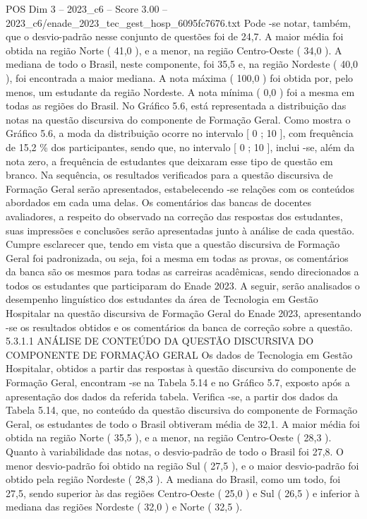 \begin{textsample}{POS Dim 3 – 2023\_c6 – Score 3.00 – 2023\_c6/enade\_2023\_tec\_gest\_hosp\_6095fc7676.txt}
Pode -se notar, também, que o desvio-padrão nesse conjunto de questões foi de 24,7.
A maior média foi obtida na região Norte ( 41,0 ), e a menor, na região Centro-Oeste ( 34,0 ).
A mediana de todo o Brasil, neste componente, foi 35,5 e, na região Nordeste ( 40,0 ), foi encontrada a maior mediana.
A nota máxima ( 100,0 ) foi obtida por, pelo menos, um estudante da região Nordeste.
A nota mínima ( 0,0 ) foi a mesma em todas as regiões do Brasil.
No Gráfico 5.6, está representada a distribuição das notas na questão discursiva do componente de Formação Geral.
Como mostra o Gráfico 5.6, a moda da distribuição ocorre no intervalo [ 0 ; 10 ], com frequência de 15,2 \% dos participantes, sendo que, no intervalo [ 0 ; 10 ], inclui -se, além da nota zero, a frequência de estudantes que deixaram esse tipo de questão em branco.
Na sequência, os resultados verificados para a questão discursiva de Formação Geral serão apresentados, estabelecendo -se relações com os conteúdos abordados em cada uma delas.
Os comentários das bancas de docentes avaliadores, a respeito do observado na correção das respostas dos estudantes, suas impressões e conclusões serão apresentadas junto à análise de cada questão.
Cumpre esclarecer que, tendo em vista que a questão discursiva de Formação Geral foi padronizada, ou seja, foi a mesma em todas as provas, os comentários da banca são os mesmos para todas as carreiras acadêmicas, sendo direcionados a todos os estudantes que participaram do Enade 2023.
A seguir, serão analisados o desempenho linguístico dos estudantes da área de Tecnologia em Gestão Hospitalar na questão discursiva de Formação Geral do Enade 2023, apresentando -se os resultados obtidos e os comentários da banca de correção sobre a questão. 5.3.1.1 ANÁLISE DE CONTEÚDO DA QUESTÃO DISCURSIVA DO COMPONENTE DE FORMAÇÃO GERAL Os dados de Tecnologia em Gestão Hospitalar, obtidos a partir das respostas à questão discursiva do componente de Formação Geral, encontram -se na Tabela 5.14 e no Gráfico 5.7, exposto após a apresentação dos dados da referida tabela.
Verifica -se, a partir dos dados da Tabela 5.14, que, no conteúdo da questão discursiva do componente de Formação Geral, os estudantes de todo o Brasil obtiveram média de 32,1.
A maior média foi obtida na região Norte ( 35,5 ), e a menor, na região Centro-Oeste ( 28,3 ).
Quanto à variabilidade das notas, o desvio-padrão de todo o Brasil foi 27,8.
O menor desvio-padrão foi obtido na região Sul ( 27,5 ), e o maior desvio-padrão foi obtido pela região Nordeste ( 28,3 ).
A mediana do Brasil, como um todo, foi 27,5, sendo superior às das regiões Centro-Oeste ( 25,0 ) e Sul ( 26,5 ) e inferior à mediana das regiões Nordeste ( 32,0 ) e Norte ( 32,5 ).

\end{textsample}
